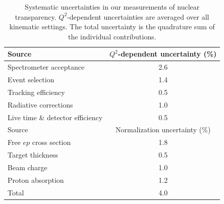 \begin{table}[htb!]
    \caption{
        Systematic uncertainties in our measurements of nuclear
        transparency.
        $Q^2$-dependent uncertainties are averaged over all kinematic settings.
        The total uncertainty is the quadrature sum of the individual
        contributions.
    }
    \label{tab:systematic_uncertainty}
    \centering
    \begin{tabular}{lc}
        \hline
        \hline
        Source                            & $Q^2$-dependent uncertainty (\%) \\
        \hline
        Spectrometer acceptance           & 2.6                              \\
        Event selection                   & 1.4                              \\
        Tracking efficiency               & 0.5                              \\
        Radiative corrections             & 1.0                              \\
        Live time \& detector efficiency  & 0.5                              \\
        \hline
        \hline
        Source                            & Normalization uncertainty (\%)   \\
        \hline
        Free $ep$ cross section           & 1.8                              \\
        Target thickness                  & 0.5                              \\
        Beam charge                       & 1.0                              \\
        Proton absorption                 & 1.2                              \\
        \hline
        \hline
        Total                             & 4.0                              \\
    \end{tabular}
\end{table}

